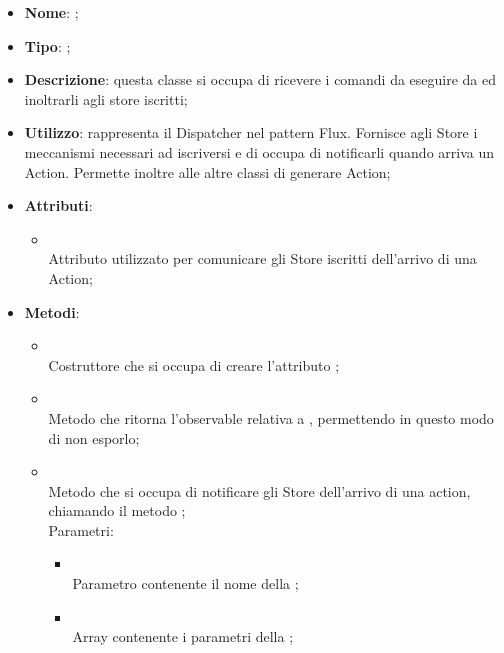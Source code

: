 \begin{itemize}
	\item \textbf{Nome}: ;
	\item \textbf{Tipo}: ;
	\item \textbf{Descrizione}: questa classe si occupa di ricevere i comandi da eseguire da  ed inoltrarli agli store iscritti;
	\item \textbf{Utilizzo}: rappresenta il Dispatcher nel pattern Flux. Fornisce agli Store i meccanismi necessari ad iscriversi e di occupa di notificarli quando arriva un Action. Permette inoltre alle altre classi di generare Action;
	\item \textbf{Attributi}:
	\begin{itemize}
		\item[]  \\
		Attributo utilizzato per comunicare gli Store iscritti dell'arrivo di una Action;
	\end{itemize}
	\item \textbf{Metodi}:
	\begin{itemize}
		\item[]  \\
		Costruttore che si occupa di creare l'attributo ;\\
		\item[]  \\
		Metodo che ritorna l'observable relativa a , permettendo in questo modo di non esporlo;\\
		\item[]  \\
		Metodo che si occupa di notificare gli Store dell'arrivo di una action, chiamando il metodo ;\\
		Parametri:
		\begin{itemize}
			\item {} \\
			Parametro contenente il nome della ;
			\item {} \\
			Array contenente i parametri della ;
		\end{itemize}
	\end{itemize}
\end{itemize}
\FloatBarrier

